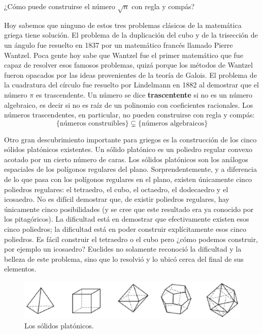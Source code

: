 \begin{exercise}
	¿Cómo puede construirse el número $\sqrt{n}$ con regla y compás?
\end{exercise}

Hoy sabemos que ninguno de estos tres problemas clásicos de la matemática
griega tiene solución. El problema de la duplicación del cubo y de la
trisección de un ángulo fue resuelto en 1837 por un matemático francés llamado
Pierre Wantzel. Poca gente hoy sabe que Wantzel fue el primer matemático que
fue capaz de resolver esos famosos problemas, quizá porque los métodos de
Wantzel fueron opacados por las ideas provenientes de la teoría de Galois.  El
problema de la cuadratura del círculo fue resuelto por Lindelmann en 1882 al
demostrar que el número $\pi$ es trascendente. Un número se dice
\textbf{trascentente} si no es un número algebraico, es decir si no es raíz de
un polinomio con coeficientes racionales. Los números trascendentes, en
particular, no pueden construirse con regla y compás:
\[
	\{\text{números construibles}\}\subsetneq\{\text{números algebraicos}\}
\]

Otro gran descubrimiento importante para griegos es la construcción de los cinco
sólidos platónicos existentes. Un sólido platónico es un poliedro regular
convexo acotado por un cierto número de caras. Los sólidos platónicos son los
análogos espaciales de los polígonos regulares del plano. Sorprendentemente, y
a diferencia de lo que pasa con los polígonos regulares en el plano, existen
únicamente cinco poliedros regulares: el tetraedro, el cubo, el octaedro, el
dodecaedro y el icosaedro. No es difícil demostrar que, de existir poliedros
regulares, hay únicamente cinco posibilidades (y se cree que este resultado era
ya conocido por los pitagóricos). La dificultad está en demostrar que
efectivamente existen esos cinco poliedros; la dificultad está en poder
construir explícitamente esos cinco poliedros. Es fácil construir el tetraedro
o el cubo pero ¿cómo podemos construir, por ejemplo un icosaedro? Euclides no
solamente reconoció la dificultad y la belleza de este problema, sino que lo
resolvió y lo ubicó cerca del final de sus elementos. 

\begin{figure}
   \centering
   \includegraphics[scale=0.7]{images/platonic}
   \caption{Los sólidos platónicos.}
   \label{fig:platonic}
\end{figure}

